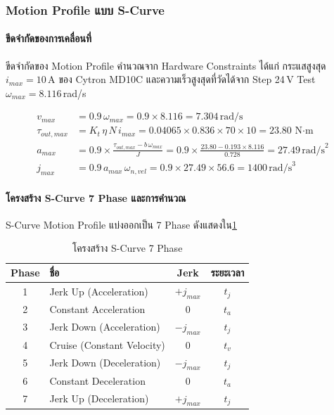 \subsubsection{Motion Profile แบบ S-Curve}
\label{subsubsec:scurve_motion_profile}

\paragraph{ขีดจำกัดของการเคลื่อนที่}

ขีดจำกัดของ Motion Profile คำนวณจาก Hardware Constraints ได้แก่
กระแสสูงสุด $i_{max} = 10$\,A ของ Cytron MD10C
และความเร็วสูงสุดที่วัดได้จาก Step 24\,V Test $\omega_{max} = 8.116$\,rad/s

\begin{align}
  v_{max}  &= 0.9\,\omega_{max}
            = 0.9 \times 8.116 = 7.304\,\text{rad/s}
  \label{eq:vmax}\\
  \tau_{out,max} &= K_t\,\eta\,N\,i_{max}
                 = 0.04065 \times 0.836 \times 70 \times 10
                 = 23.80\,\text{N$\cdot$m}
  \label{eq:taumax}\\
  a_{max}  &= 0.9 \times \frac{\tau_{out,max} - b\,\omega_{max}}{J}
            = 0.9 \times \frac{23.80 - 0.193 \times 8.116}{0.728}
            = 27.49\,\text{rad/s}^2
  \label{eq:amax}\\
  j_{max}  &= 0.9\,a_{max}\,\omega_{n,vel}
            = 0.9 \times 27.49 \times 56.6
            = 1400\,\text{rad/s}^3
  \label{eq:jmax}
\end{align}

\paragraph{โครงสร้าง S-Curve 7 Phase และการคำนวณ}

S-Curve Motion Profile แบ่งออกเป็น 7 Phase ดังแสดงใน\cref{tab:scurve_phases}

\begin{table}[H]
  \centering
  \caption{โครงสร้าง S-Curve 7 Phase}
  \label{tab:scurve_phases}
  \begin{tabular}{clcc}
    \toprule
    Phase & ชื่อ & Jerk & ระยะเวลา \\
    \midrule
    1 & Jerk Up (Acceleration)    & $+j_{max}$ & $t_j$ \\
    2 & Constant Acceleration     & $0$        & $t_a$ \\
    3 & Jerk Down (Acceleration)  & $-j_{max}$ & $t_j$ \\
    4 & Cruise (Constant Velocity) & $0$       & $t_v$ \\
    5 & Jerk Down (Deceleration)  & $-j_{max}$ & $t_j$ \\
    6 & Constant Deceleration     & $0$        & $t_a$ \\
    7 & Jerk Up (Deceleration)    & $+j_{max}$ & $t_j$ \\
    \bottomrule
  \end{tabular}
\end{table}

